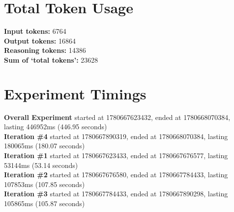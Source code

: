\documentclass{article}
\begin{document}
\section*{Total Token Usage}
\textbf{Input tokens: }6764
\\\textbf{Output tokens: }16864
\\\textbf{Reasoning tokens: }14386
\\\textbf{Sum of `total tokens': }23628
\section*{Experiment Timings}
\textbf{Overall Experiment} started at 1780667623432, ended at 1780668070384, lasting 446952ms (446.95 seconds)
\\\textbf{Iteration \#4} started at 1780667890319, ended at 1780668070384, lasting 180065ms (180.07 seconds)
\\\textbf{Iteration \#1} started at 1780667623433, ended at 1780667676577, lasting 53144ms (53.14 seconds)
\\\textbf{Iteration \#2} started at 1780667676580, ended at 1780667784433, lasting 107853ms (107.85 seconds)
\\\textbf{Iteration \#3} started at 1780667784433, ended at 1780667890298, lasting 105865ms (105.87 seconds)
\end{document}
